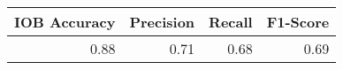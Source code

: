 \begin{tabular}{rrrr}
\toprule
 IOB Accuracy &  Precision &  Recall &  F1-Score \\
\midrule
         0.88 &       0.71 &    0.68 &      0.69 \\
\bottomrule
\end{tabular}
